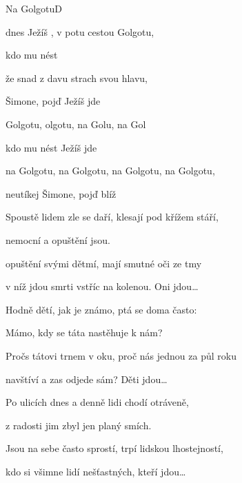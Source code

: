 \begin{song}{Na Golgotu}{D}{}

\begin{SBVerse}

dnes Ježíš , v potu  cestou  Golgotu,

 kdo mu  nést 

 že snad  z davu  strach svou hlavu,

 Šimone, pojď  Ježíš jde

\end{SBVerse}

\begin{SBChorus}

 Golgotu, olgotu, na Golu, na Gol

 kdo mu  nést  Ježíš jde

na Golgotu, na Golgotu, na Golgotu, na Golgotu,

neutíkej Šimone, pojď blíž 

\end{SBChorus}

\begin{SBVerse}

Spoustě lidem zle se daří, klesají pod křížem stáří,

nemocní a opuštění jsou.

opuštění svými dětmí, mají smutné oči ze tmy

v níž jdou smrti vstříc na kolenou. Oni jdou\dots

\end{SBVerse}

\begin{SBVerse}

Hodně dětí, jak je známo, ptá se doma často:

Mámo, kdy se táta nastěhuje k nám?

Pročs tátovi trnem v oku, proč nás jednou za půl roku

navštíví a zas odjede sám? Děti jdou\dots

\end{SBVerse}

\begin{SBVerse}

Po ulicích dnes a denně lidi chodí otráveně,

z radosti jim zbyl jen planý smích.

Jsou na sebe často sprostí, trpí lidskou lhostejností,

kdo si všimne lidí nešťastných, kteří jdou\dots

\end{SBVerse}

\end{song}

\pagebreak

